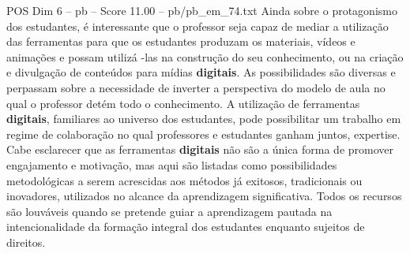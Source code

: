 \begin{textsample}{POS Dim 6 – pb – Score 11.00 – pb/pb\_em\_74.txt}
Ainda sobre o protagonismo dos estudantes, é interessante que o professor seja capaz de mediar a utilização das ferramentas para que os estudantes produzam os materiais, vídeos e animações e possam utilizá -las na construção do seu conhecimento, ou na criação e divulgação de conteúdos para mídias \textbf{digitais}.
As possibilidades são diversas e perpassam sobre a necessidade de inverter a perspectiva do modelo de aula no qual o professor detém todo o conhecimento.
A utilização de ferramentas \textbf{digitais}, familiares ao universo dos estudantes, pode possibilitar um trabalho em regime de colaboração no qual professores e estudantes ganham juntos, expertise.
Cabe esclarecer que as ferramentas \textbf{digitais} não são a única forma de promover engajamento e motivação, mas aqui são listadas como possibilidades metodológicas a serem acrescidas aos métodos já exitosos, tradicionais ou inovadores, utilizados no alcance da aprendizagem significativa.
Todos os recursos são louváveis quando se pretende guiar a aprendizagem pautada na intencionalidade da formação integral dos estudantes enquanto sujeitos de direitos.

\end{textsample}
